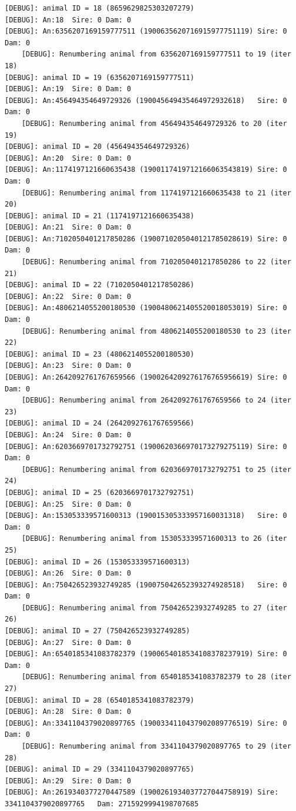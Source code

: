 \documentclass[
  letterpaper,
  DIV=11,
  numbers=noendperiod]{scrreprt}
\begin{document}
\begin{codelisting}
{\begin{verbatim}
[DEBUG]: animal ID = 18 (8659629825303207279)
[DEBUG]: An:18  Sire: 0 Dam: 0
[DEBUG]: An:6356207169159777511 (1900635620716915977751119) Sire: 0 Dam: 0
    [DEBUG]: Renumbering animal from 6356207169159777511 to 19 (iter 18)
[DEBUG]: animal ID = 19 (6356207169159777511)
[DEBUG]: An:19  Sire: 0 Dam: 0
[DEBUG]: An:456494354649729326 (190045649435464972932618)   Sire: 0 Dam: 0
    [DEBUG]: Renumbering animal from 456494354649729326 to 20 (iter 19)
[DEBUG]: animal ID = 20 (456494354649729326)
[DEBUG]: An:20  Sire: 0 Dam: 0
[DEBUG]: An:1174197121660635438 (1900117419712166063543819) Sire: 0 Dam: 0
    [DEBUG]: Renumbering animal from 1174197121660635438 to 21 (iter 20)
[DEBUG]: animal ID = 21 (1174197121660635438)
[DEBUG]: An:21  Sire: 0 Dam: 0
[DEBUG]: An:7102050401217850286 (1900710205040121785028619) Sire: 0 Dam: 0
    [DEBUG]: Renumbering animal from 7102050401217850286 to 22 (iter 21)
[DEBUG]: animal ID = 22 (7102050401217850286)
[DEBUG]: An:22  Sire: 0 Dam: 0
[DEBUG]: An:4806214055200180530 (1900480621405520018053019) Sire: 0 Dam: 0
    [DEBUG]: Renumbering animal from 4806214055200180530 to 23 (iter 22)
[DEBUG]: animal ID = 23 (4806214055200180530)
[DEBUG]: An:23  Sire: 0 Dam: 0
[DEBUG]: An:2642092761767659566 (1900264209276176765956619) Sire: 0 Dam: 0
    [DEBUG]: Renumbering animal from 2642092761767659566 to 24 (iter 23)
[DEBUG]: animal ID = 24 (2642092761767659566)
[DEBUG]: An:24  Sire: 0 Dam: 0
[DEBUG]: An:6203669701732792751 (1900620366970173279275119) Sire: 0 Dam: 0
    [DEBUG]: Renumbering animal from 6203669701732792751 to 25 (iter 24)
[DEBUG]: animal ID = 25 (6203669701732792751)
[DEBUG]: An:25  Sire: 0 Dam: 0
[DEBUG]: An:153053339571600313 (190015305333957160031318)   Sire: 0 Dam: 0
    [DEBUG]: Renumbering animal from 153053339571600313 to 26 (iter 25)
[DEBUG]: animal ID = 26 (153053339571600313)
[DEBUG]: An:26  Sire: 0 Dam: 0
[DEBUG]: An:750426523932749285 (190075042652393274928518)   Sire: 0 Dam: 0
    [DEBUG]: Renumbering animal from 750426523932749285 to 27 (iter 26)
[DEBUG]: animal ID = 27 (750426523932749285)
[DEBUG]: An:27  Sire: 0 Dam: 0
[DEBUG]: An:6540185341083782379 (1900654018534108378237919) Sire: 0 Dam: 0
    [DEBUG]: Renumbering animal from 6540185341083782379 to 28 (iter 27)
[DEBUG]: animal ID = 28 (6540185341083782379)
[DEBUG]: An:28  Sire: 0 Dam: 0
[DEBUG]: An:3341104379020897765 (1900334110437902089776519) Sire: 0 Dam: 0
    [DEBUG]: Renumbering animal from 3341104379020897765 to 29 (iter 28)
[DEBUG]: animal ID = 29 (3341104379020897765)
[DEBUG]: An:29  Sire: 0 Dam: 0
[DEBUG]: An:2619340377270447589 (1900261934037727044758919) Sire: 3341104379020897765   Dam: 2715929994198707685

\end{verbatim}}
\end{codelisting}
\end{document}
